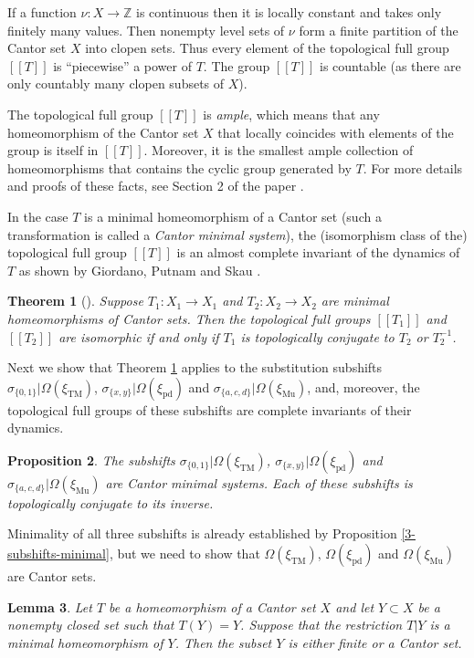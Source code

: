 \documentclass[12pt]{article}
\newtheorem{theorem}{Theorem}[section]
\newtheorem{lemma}[theorem]{Lemma}
\newtheorem{proposition}[theorem]{Proposition}
\theoremstyle{definition}
\def\bZ{\mathbb{Z}}
\def\si{\sigma}
\def\Om{\Omega}
\def\xiTM{\xi_{\mathrm{TM}}}
\def\xipd{\xi_{\mathrm{pd}}}
\def\xiGE{\xi_{\mathrm{Mu}}}
\begin{document}
If a function $\nu:X\to\bZ$ is continuous then it is locally constant and
takes only finitely many values.  Then nonempty level sets of $\nu$ form a 
finite partition of the Cantor set $X$ into clopen sets.  Thus every 
element of the topological full group $[[T]]$ is ``piecewise'' a power of 
$T$.  The group $[[T]]$ is countable (as there are only countably many 
clopen subsets of $X$).

The topological full group $[[T]]$ is \emph{ample}, which means that any 
homeomorphism of the Cantor set $X$ that locally coincides with elements of 
the group is itself in $[[T]]$.  Moreover, it is the smallest ample 
collection of homeomorphisms that contains the cyclic group generated by 
$T$.  For more details and proofs of these facts, see Section 2 of the 
paper \cite{GrigVor24}.

In the case $T$ is a minimal homeomorphism of a Cantor set (such a 
transformation is called a \emph{Cantor minimal system}), the (isomorphism 
class of the) topological full group $[[T]]$ is an almost complete 
invariant of the dynamics of $T$ as shown by Giordano, Putnam and Skau 
\cite{GPS}.

\begin{theorem}[\cite{GPS}]\label{flip-conjugacy}
Suppose $T_1:X_1\to X_1$ and $T_2:X_2\to X_2$ are minimal homeomorphisms of 
Cantor sets.  Then the topological full groups $[[T_1]]$ and $[[T_2]]$ are 
isomorphic if and only if $T_1$ is topologically conjugate to $T_2$ or 
$T_2^{-1}$.
\end{theorem}

Next we show that Theorem \ref{flip-conjugacy} applies to the substitution 
subshifts $\si_{\{0,1\}}|\Om(\xiTM)$, $\si_{\{x,y\}}|\Om(\xipd)$ and 
$\si_{\{a,c,d\}}|\Om(\xiGE)$, and, moreover, the topological full groups of 
these subshifts are complete invariants of their dynamics.

\begin{proposition}\label{3-subshifts-Cantor}
The subshifts $\si_{\{0,1\}}|\Om(\xiTM)$, $\si_{\{x,y\}}|\Om(\xipd)$ and 
$\si_{\{a,c,d\}}|\Om(\xiGE)$ are Cantor minimal systems.  Each of these 
subshifts is topologically conjugate to its inverse.
\end{proposition}

Minimality of all three subshifts is already established by Proposition 
\ref{3-subshifts-minimal}, but we need to show that $\Om(\xiTM)$, 
$\Om(\xipd)$ and $\Om(\xiGE)$ are Cantor sets.

\begin{lemma}\label{finite-or-Cantor}
Let $T$ be a homeomorphism of a Cantor set $X$ and let $Y\subset X$ be a 
nonempty closed set such that $T(Y)=Y$.  Suppose that the restriction $T|Y$ 
is a minimal homeomorphism of $Y$.  Then the subset $Y$ is either finite or 
a Cantor set.
\end{lemma}
\end{document}
